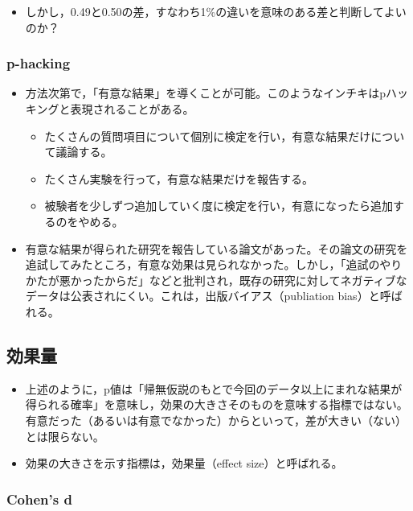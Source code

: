 \documentclass[]{article}
\providecommand{\tightlist}{%
  \setlength{\itemsep}{0pt}\setlength{\parskip}{0pt}}
\begin{document}
\begin{itemize}
\tightlist
\item
  しかし，0.49と0.50の差，すなわち1\%の違いを意味のある差と判断してよいのか？
\end{itemize}

\subsubsection{p-hacking}\label{p-hacking}

\begin{itemize}
\tightlist
\item
  方法次第で，「有意な結果」を導くことが可能。このようなインチキはpハッキングと表現されることがある。

  \begin{itemize}
  \tightlist
  \item
    たくさんの質問項目について個別に検定を行い，有意な結果だけについて議論する。\\
  \item
    たくさん実験を行って，有意な結果だけを報告する。\\
  \item
    被験者を少しずつ追加していく度に検定を行い，有意になったら追加するのをやめる。
  \end{itemize}
\item
  有意な結果が得られた研究を報告している論文があった。その論文の研究を追試してみたところ，有意な効果は見られなかった。しかし，「追試のやりかたが悪かったからだ」などと批判され，既存の研究に対してネガティブなデータは公表されにくい。これは，出版バイアス（publiation
  bias）と呼ばれる。
\end{itemize}

\subsection{効果量}

\begin{itemize}
\item
  上述のように，p値は「帰無仮説のもとで今回のデータ以上にまれな結果が得られる確率」を意味し，効果の大きさそのものを意味する指標ではない。有意だった（あるいは有意でなかった）からといって，差が大きい（ない）とは限らない。
\item
  効果の大きさを示す指標は，効果量（effect size）と呼ばれる。
\end{itemize}

\subsubsection{Cohen's d}\label{cohens-d}
\end{document}
